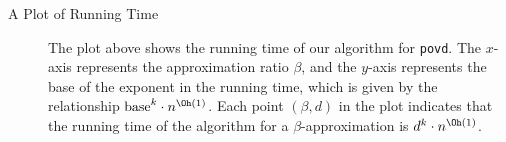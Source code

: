 \documentclass{article}
\begin{document}

\begin{description}
    \item[A Plot of Running Time] The plot above shows the running time of our algorithm for \texttt{povd}. The \( x \)-axis represents the approximation ratio \(\beta\), and the \( y \)-axis represents the base of the exponent in the running time, which is given by the relationship \( \textnormal{base}^{k} \cdot n^{\Oh(1)} \). Each point \((\beta, d)\) in the plot indicates that the running time of the algorithm for a \(\beta\)-approximation is \( d^{k} \cdot n^{\Oh(1)} \).
\end{description}
\end{document}

